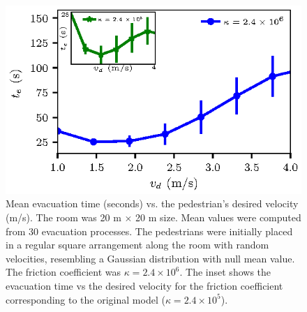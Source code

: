 \begin{figure}[htbp!]
\includegraphics[width=\columnwidth]
{./plots/fis_kx10.eps}
\caption{\label{fis} Mean evacuation time (seconds) vs. the pedestrian’s desired velocity (m/s). The room was 20 m $\times$ 20 m size. Mean values were computed from 30 evacuation processes. The pedestrians were initially placed in a regular square arrangement along the room with random velocities, resembling a Gaussian distribution with null mean value. The friction coefficient was $\kappa=2.4\times10^{6}$. The inset shows the evacuation time vs the desired velocity for the friction coefficient corresponding to the original model ($\kappa=2.4\times10^{5}$).  }
\end{figure}



